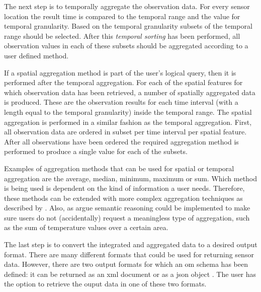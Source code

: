 The next step is to temporally aggregate the observation data. For every sensor location the result time is compared to the temporal range and the value for temporal granularity. Based on the temporal granularity subsets of the temporal range should be selected. After this \textit{temporal sorting} has been performed, all observation values in each of these subsets should be aggregated according to a user defined method. 

If a spatial aggregation method is part of the user's logical query, then it is performed after the temporal aggregation. For each of the spatial features for which observation data has been retrieved, a number of spatially aggregated data is produced. These are the observation results for each time interval (with a length equal to the temporal granularity) inside the temporal range. The spatial aggregation is performed in a similar fashion as the temporal aggregation. First, all observation data are ordered in subset per time interval per spatial feature. After all observations have been ordered the required aggregation method is performed to produce a single value for each of the subsets. 

Examples of aggregation methods that can be used for spatial or temporal aggregation are the average, median, minimum, maximum or sum. Which method is being used is dependent on the kind of information a user needs. Therefore, these methods can be extended with more complex aggregation techniques as described by \cite{SW:Ganesan}. Also, as \cite{SSW:Stasch4} argue semantic reasoning could be implemented to make sure users do not (accidentally) request a meaningless type of aggregation, such as the sum of temperature values over a certain area. 

The last step is to convert the integrated and aggregated data to a desired output format. There are many different formats that could be used for returning sensor data. However, there are two output formats for which an \ac{om} schema has been defined: it can be returned as an \ac{xml} document \citep{SW:ISO} or as a \ac{json} object \citep{SW:OGC6}. The user has the option to retrieve the ouput data in one of these two formats.  




